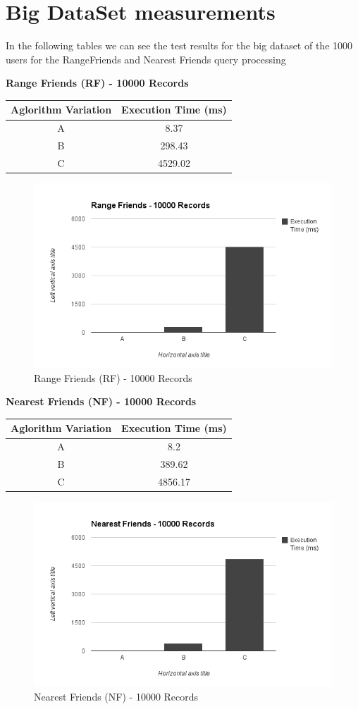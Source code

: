 \documentclass[prodmode,acmtods]{acmsmall} %
\begin{document}
\section{Big DataSet measurements}
In the following tables we can see the test results for the big dataset of the 1000 users
for the RangeFriends and Nearest Friends query processing
\newline

\textbf{Range Friends (RF) - 10000 Records}
\begin{tabular}{|c|c|}
\hline \rule[-2ex]{0pt}{5.5ex} Aglorithm Variation & Execution Time (ms) \\ 
\hline \rule[-2ex]{0pt}{5.5ex} A & 8.37 \\ 
\hline \rule[-2ex]{0pt}{5.5ex} B & 298.43 \\ 
\hline \rule[-2ex]{0pt}{5.5ex} C & 4529.02 \\ 
\hline 
\end{tabular} 

\begin{figure}[h]
\centering
\includegraphics[width=0.7\linewidth]{./graphics/rf_10000}
\caption{Range Friends (RF) - 10000 Records}
\label{fig:nf_100}
\end{figure}


\textbf{Nearest Friends (NF) - 10000 Records}
\begin{tabular}{|c|c|}
\hline \rule[-2ex]{0pt}{5.5ex} Aglorithm Variation & Execution Time (ms) \\ 
\hline \rule[-2ex]{0pt}{5.5ex} A & 8.2 \\ 
\hline \rule[-2ex]{0pt}{5.5ex} B & 389.62 \\ 
\hline \rule[-2ex]{0pt}{5.5ex} C & 4856.17 \\ 
\hline 
\end{tabular} 

\begin{figure}[h]
\centering
\includegraphics[width=0.7\linewidth]{./graphics/nf_10000}
\caption{Nearest Friends (NF) - 10000 Records}
\label{fig:nf_100}
\end{figure}
\end{document}
